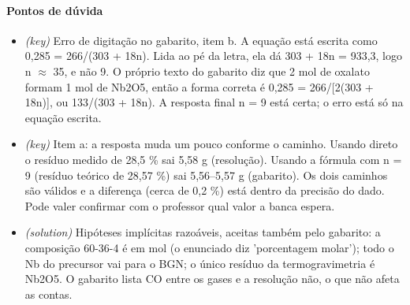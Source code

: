 \documentclass{article}%
\begin{document}
\paragraph{Pontos de dúvida}%
\begin{itemize}%
\item%
\textit{(key)} Erro de digitação no gabarito, item b. A equação está escrita como 0,285 = 266/(303 + 18n). Lida ao pé da letra, ela dá 303 + 18n = 933,3, logo n $\approx$ 35, e não 9. O próprio texto do gabarito diz que 2 mol de oxalato formam 1 mol de Nb2O5, então a forma correta é 0,285 = 266/{[}2(303 + 18n){]}, ou 133/(303 + 18n). A resposta final n = 9 está certa; o erro está só na equação escrita.%
\item%
\textit{(key)} Item a: a resposta muda um pouco conforme o caminho. Usando direto o resíduo medido de 28,5 \% sai 5,58 g (resolução). Usando a fórmula com n = 9 (resíduo teórico de 28,57 \%) sai 5,56--5,57 g (gabarito). Os dois caminhos são válidos e a diferença (cerca de 0,2 \%) está dentro da precisão do dado. Pode valer confirmar com o professor qual valor a banca espera.%
\item%
\textit{(solution)} Hipóteses implícitas razoáveis, aceitas também pelo gabarito: a composição 60{-}36{-}4 é em mol (o enunciado diz 'porcentagem molar'); todo o Nb do precursor vai para o BGN; o único resíduo da termogravimetria é Nb2O5. O gabarito lista CO entre os gases e a resolução não, o que não afeta as contas.%
\end{itemize}%
\end{document}
